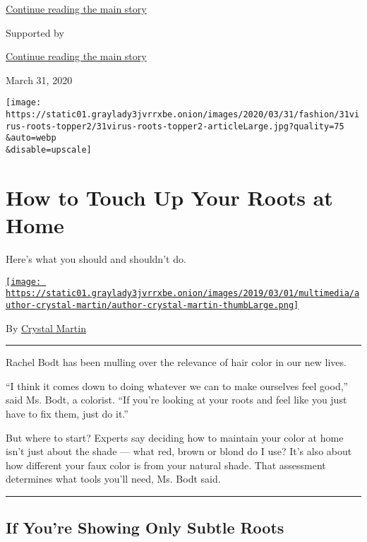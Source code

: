 \protect\hyperlink{after-top}{Continue reading the main story}

Supported by

\protect\hyperlink{after-sponsor}{Continue reading the main story}

March 31, 2020

\texttt{[image: https://static01.graylady3jvrrxbe.onion/images/2020/03/31/fashion/31virus-roots-topper2/31virus-roots-topper2-articleLarge.jpg?quality=75\\\&auto=webp\\\&disable=upscale]}

\hypertarget{how-to-touch-up-your-roots-at-home}{%
\section{How to Touch Up Your Roots at
Home}\label{how-to-touch-up-your-roots-at-home}}

Here's what you should and shouldn't do.

\href{https://www.nytimes3xbfgragh.onion/by/crystal-martin}{\texttt{[image: https://static01.graylady3jvrrxbe.onion/images/2019/03/01/multimedia/author-crystal-martin/author-crystal-martin-thumbLarge.png]}}

By \href{https://www.nytimes3xbfgragh.onion/by/crystal-martin}{Crystal
Martin}

\begin{center}\rule{0.5\linewidth}{\linethickness}\end{center}

Rachel Bodt has been mulling over the relevance of hair color in our new
lives.

``I think it comes down to doing whatever we can to make ourselves feel
good,'' said Ms. Bodt, a colorist. ``If you're looking at your roots and
feel like you just have to fix them, just do it.''

But where to start? Experts say deciding how to maintain your color at
home isn't just about the shade --- what red, brown or blond do I use?
It's also about how different your faux color is from your natural
shade. That assessment determines what tools you'll need, Ms. Bodt said.

\begin{center}\rule{0.5\linewidth}{\linethickness}\end{center}

\hypertarget{if-youre-showing-only-subtle-roots}{%
\subsection{If You're Showing Only Subtle
Roots}\label{if-youre-showing-only-subtle-roots}}


